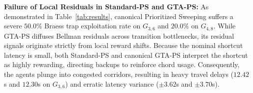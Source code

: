 \documentclass[11pt,a4paper]{article}
\begin{document}
\begin{table}[t]
\centering
\caption{Benchmark results on dynamic congested grids (30 evaluation episodes per configuration, backup budget $K=15$).}
\label{tab:results}
\end{table}

\textbf{Failure of Local Residuals in Standard-PS and GTA-PS:}
As demonstrated in Table~\ref{tab:results}, canonical Prioritized Sweeping suffers a severe $50.0\%$ Braess trap exploitation rate on $G_{3,6}$ and $20.0\%$ on $G_{4,8}$. While GTA-PS diffuses Bellman residuals across transition bottlenecks, its residual signals originate strictly from local reward shifts. Because the nominal shortcut latency is small, both Standard-PS and canonical GTA-PS interpret the shortcut as highly rewarding, directing backups to reinforce chord usage. Consequently, the agents plunge into congested corridors, resulting in heavy travel delays ($12.42$s and $12.30$s on $G_{3,6}$) and erratic latency variance ($\pm 3.62$s and $\pm 3.70$s).
\end{document}
